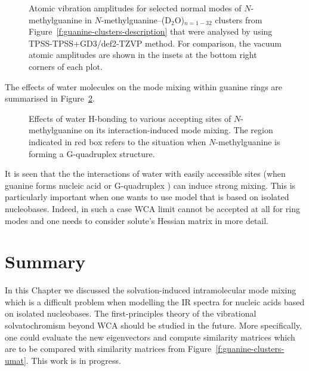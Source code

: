 \documentclass[a4paper,titlepage,twoside,fleqn,12pt]{book}
\begin{document}
\begin{refsection}
\begin{figure}[t!]
{}
\caption{
Atomic vibration amplitudes for selected normal modes of
$N$-methylguanine
in $N$-methylguanine--(D$_2$O)$_{n=1-32}$ clusters from 
Figure~\ref{f:guanine-clusters-description} that were analysed
by using TPSS-TPSS+GD3/def2-TZVP method. For comparison, the vacuum atomic amplitudes
are shown in the insets at the bottom right corners of each plot.
\label{f:guanine-clusters-amplitudes}}
\end{figure}
%

The effects of water molecules on the mode mixing
within guanine rings are summarised in Figure~\ref{f:guanine-clusters-summary}.
%
\begin{figure}[t!]
\centering
\setlength\fboxsep{0.4pt}
\setlength\fboxrule{0.5pt}
\caption{
Effects of water H-bonding to various accepting sites
of $N$-methylguanine on its interaction\hyp{}induced mode mixing.
The region indicated in red box refers to the situation
when $N$-methylguanine is forming a G-quadruplex structure. \citep{Peng.Jones.Tokmakoff.JACS.2011}
\label{f:guanine-clusters-summary}}
\end{figure}
%
It is seen that the the interactions of water with easily accessible sites (when guanine
forms nucleic acid or G-quadruplex \citep{Peng.Jones.Tokmakoff.JACS.2011}) 
can induce strong mixing.
This is particularly important when one wants to use model that
is based on isolated nucleobases. Indeed, in such a case WCA
limit cannot be accepted at all for ring modes and one needs to consider
solute's Hessian matrix in more detail.

\section{Summary}

In this Chapter we discussed the solvation\hyp{}induced
intramolecular mode mixing which is a difficult problem
when modelling the IR spectra for nucleic acids based on
isolated nucleobases. The first\hyp{}principles theory
of the vibrational solvatochromism beyond WCA should be studied
in the future. More specifically, one could evaluate
the new eigenvectors and compute similarity matrices
which are to be compared with similarity matrices from
Figure~\ref{f:guanine-clusters-umat}. This work is in progress.






\end{refsection}
\end{document}
